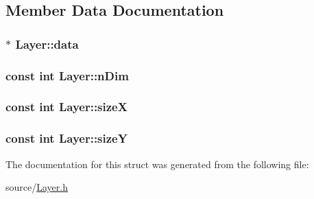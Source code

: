 \subsection{Member Data Documentation}
\hypertarget{struct_layer_ab85c711ae2d70e26fb05644abd588c50}{}
\subsubsection[{data}]{$\ast$ Layer\+::data}\label{struct_layer_ab85c711ae2d70e26fb05644abd588c50}
\hypertarget{struct_layer_ab937eda50c83c45e9bc814f6be6abb46}{}
\subsubsection[{n\+Dim}]{\setlength{\rightskip}{0pt plus 5cm}const int Layer\+::n\+Dim}\label{struct_layer_ab937eda50c83c45e9bc814f6be6abb46}
\hypertarget{struct_layer_a4904db3e1890920dd364930bb68efa07}{}
\subsubsection[{size\+X}]{\setlength{\rightskip}{0pt plus 5cm}const int Layer\+::size\+X}\label{struct_layer_a4904db3e1890920dd364930bb68efa07}
\hypertarget{struct_layer_a7ec60475ab6fdf004e5ed4be01b1a318}{}
\subsubsection[{size\+Y}]{\setlength{\rightskip}{0pt plus 5cm}const int Layer\+::size\+Y}\label{struct_layer_a7ec60475ab6fdf004e5ed4be01b1a318}


The documentation for this struct was generated from the following file\+:\begin{DoxyCompactItemize}
\item 
source/\hyperlink{_layer_8h}{Layer.\+h}\end{DoxyCompactItemize}
